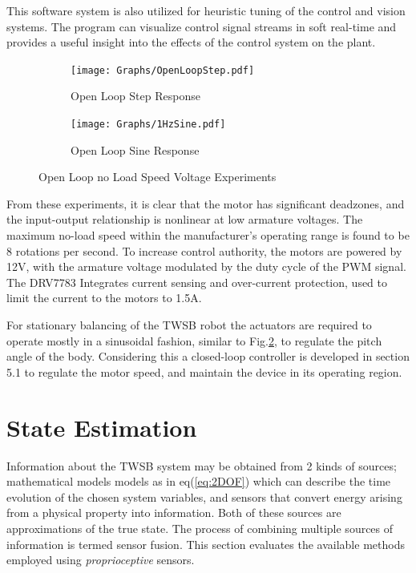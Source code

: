         This software system is also utilized for heuristic tuning of the control
        and vision systems. The program can visualize control signal streams in soft real-time 
        and provides a useful insight into the effects of the control system on the plant.

        \begin{figure}[H]
            \centering
            \begin{subfigure}[b]{0.45\textwidth}
            \texttt{[image: Graphs/OpenLoopStep.pdf]}
            \caption{Open Loop Step Response}
            \label{fig:openstep}
            \end{subfigure}
            \hfill
            \begin{subfigure}[b]{0.45\textwidth}
            \texttt{[image: Graphs/1HzSine.pdf]}
            \caption{Open Loop Sine Response}
            \label{fig:opensine}
            \end{subfigure}
            \caption{Open Loop no Load Speed Voltage Experiments}
            \label{fig:openloop}
        \end{figure}

        From these experiments, it is clear that the motor has significant deadzones, 
        and the input-output relationship is nonlinear at low armature voltages. 
        The maximum no-load speed within the manufacturer's operating range is found to be 8 rotations per second.
        To increase control authority, the motors are powered by 12V, with the armature voltage modulated by 
        the duty cycle of the PWM signal. The DRV7783 Integrates current sensing and over-current protection,
        used to limit the current to the motors to 1.5A.
              
        For stationary balancing of the TWSB robot
        the actuators are required to operate mostly in a sinusoidal fashion, 
        similar to Fig.\ref{fig:opensine}, to regulate the pitch angle of the body.
        Considering this a closed-loop controller is developed in section 5.1 to regulate the motor speed,
        and maintain the device in its operating region. 
       
           \section{State Estimation}
        Information about the TWSB system may be obtained from 2 kinds of sources; 
        mathematical models models as in eq(\ref{eq:2DOF}) which can describe the time evolution of the chosen system variables, 
        and sensors that convert energy arising from a physical property into information. Both of these sources 
        are approximations of the true state. The process of combining multiple sources of information is termed sensor fusion.
        This section evaluates the available methods employed using \textit{proprioceptive} sensors.
